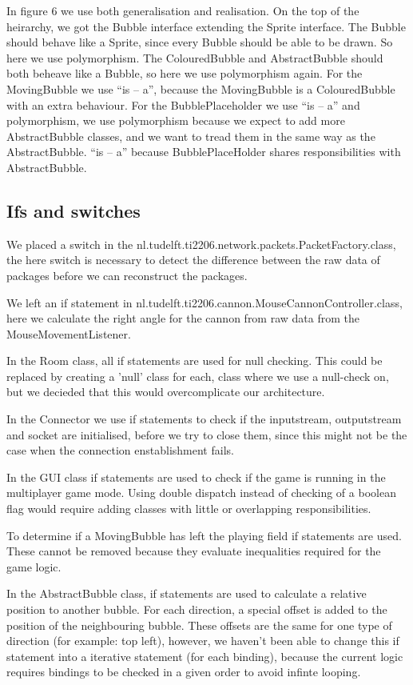 \documentclass[a4paper]{article}
\begin{document}
In figure 6 we use both generalisation and realisation. On the top of the heirarchy, we got the Bubble interface extending the Sprite interface. The Bubble should behave like a Sprite, since every Bubble should be able to be drawn. So here we use polymorphism.
The ColouredBubble and AbstractBubble should both beheave like a Bubble, so here we use polymorphism again.
For the MovingBubble we use “is – a”, because the MovingBubble is a ColouredBubble with an extra behaviour.
For the BubblePlaceholder we use “is – a” and polymorphism, we use polymorphism because we expect to add more AbstractBubble classes, and we want to tread them in the same way as the AbstractBubble. “is – a” because BubblePlaceHolder shares responsibilities with AbstractBubble.



\subsection{Ifs and switches}
We placed a switch in the nl.tudelft.ti2206.network.packets.PacketFactory.class, the here switch is necessary to detect the difference between the raw data of packages before we can reconstruct the packages.

We left an if statement in nl.tudelft.ti2206.cannon.MouseCannonController.class, here we calculate the right angle for the cannon from raw data from the MouseMovementListener.

In the Room class, all if statements are used for null checking. This could be replaced by creating a 'null' class for each, class where we use a null-check on, but we decieded that this would overcomplicate our architecture.

In the Connector we use if statements to check if the inputstream, outputstream and socket are initialised, before we try to close them, since this might not be the case when the connection enstablishment fails.

In the GUI class if statements are used to check if the game is running in the multiplayer game mode. Using double dispatch instead of checking of a boolean flag would require adding classes with little or overlapping responsibilities.

To determine if a MovingBubble has left the playing field if statements are used. These cannot be removed because they evaluate inequalities required for the game logic.

In the AbstractBubble class, if statements are used to calculate a relative position to another bubble. For each direction, a special offset is added to the position of the neighbouring bubble. These offsets are the same for one type of direction (for example: top left), however, we haven't been able to change this if statement into a iterative statement (for each binding), because the current logic requires bindings to be checked in a given order to avoid infinte looping.


\pagebreak
\end{document}
